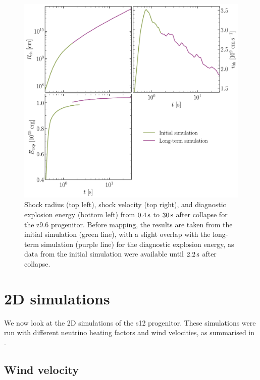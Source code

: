 \begin{figure}[ht!]
    \centering
    \includegraphics[width=0.9\linewidth]{figures/quantities_1d.pdf}
    \caption{Shock radius (top left), shock velocity (top right), and diagnostic explosion energy (bottom left) from \(0.4\,\mathrm{s}\) to \(30\,\mathrm{s}\) after collapse for the z9.6 progenitor. Before mapping, the results are taken from the initial simulation (green line), with a slight overlap with the long-term simulation (purple line) for the diagnostic explosion energy, as data from the initial simulation were available until \(2.2\,\mathrm{s}\) after collapse.}
    \label{fig:quantities_1d}
\end{figure}

\clearpage

\section{2D simulations} \label{sec:results_2d}

We now look at the 2D simulations of the s12 progenitor. These simulations were run with different neutrino heating factors and wind velocities, as summarised in .

\subsection{Wind velocity}

